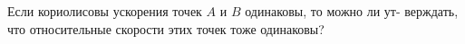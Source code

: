 Если кориолисовы ускорения точек $A$ и $B$ одинаковы, то можно ли ут-
верждать, что относительные скорости этих точек тоже одинаковы?
